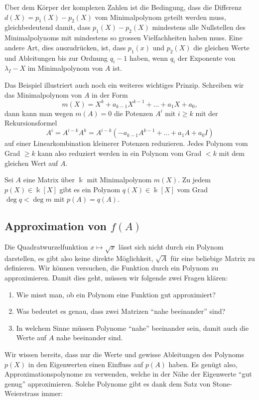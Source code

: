 Über dem Körper der komplexen Zahlen ist die Bedingung, dass die Differenz
$d(X)=p_1(X)-p_2(X)$ vom Minimalpolynom geteilt werden muss, gleichbedeutend
damit, dass $p_1(X)-p_2(X)$ mindestens alle Nullstellen des Minimalpolynoms
mit mindestens so grossen Vielfachheiten haben muss.
Eine andere Art, dies auszudrücken, ist, dass $p_1(x)$ und $p_2(X)$
die gleichen Werte und Ableitungen bis zur Ordnung $q_i-1$ haben, wenn
$q_i$ der Exponente von $\lambda_I-X$ im Minimalpolynom von $A$ ist.

Das Beispiel illustriert auch noch ein weiteres wichtiges Prinzip.
Schreiben wir das Minimalpolynom von $A$ in der Form
\[
m(X)
=
X^k + a_{k-1}X^{k-1} + \dots + a_1X + a_0,
\]
dann kann man wegen $m(A)=0$ die Potenzen $A^i$ mit $i\ge k$ mit der
Rekursionsformel
\[
A^i
=
A^{i-k}A^k
=
A^{i-k}(-a_{k-1}A^{k-1}+ \dots + a_1 A + a_0I)
\]
auf einer Linearkombination kleinerer Potenzen reduzieren.
Jedes Polynom vom Grad $\ge k$ kann also reduziert werden in
ein Polynom vom Grad $<k$ mit dem gleichen Wert auf $A$.

\begin{satz}
\label{buch:eigenwerte:satz:reduktion}
Sei $A$ eine Matrix über $\Bbbk$ mit Minimalpolynom $m(X)$.
Zu jedem $p(X)\in\Bbbk[X]$ gibt es ein Polynom $q(X)\in\Bbbk[X]$
vom Grad $\deg q<\deg m$ mit $p(A)=q(A)$.
\end{satz}

%
%
\subsection{Approximation von $f(A)$
\label{buch:subsection:approximation}}
Die Quadratwurzelfunktion $x\mapsto\sqrt{x}$ lässt sich nicht durch ein
%
Polynom darstellen, es gibt also keine direkte Möglichkeit, $\sqrt{A}$
für eine beliebige Matrix zu definieren.
Wir können versuchen, die Funktion durch ein Polynom zu approximieren.
Damit dies geht, müssen wir folgende zwei Fragen klären:
\begin{enumerate}
\item
Wie misst man, ob ein Polynom eine Funktion gut approximiert?
\item
Was bedeutet es genau, dass zwei Matrizen ``nahe beeinander'' sind?
\item
In welchem Sinne müssen Polynome ``nahe'' beeinander sein, damit
auch die Werte auf $A$ nahe beeinander sind.
\end{enumerate}

Wir wissen bereits, dass nur die Werte und gewisse Ableitungen des
Polynoms $p(X)$ in den Eigenwerten einen Einfluss auf $p(A)$ haben.
Es genügt also, Approximationspolynome zu verwenden, welche in der Nähe
der Eigenwerte ``gut genug'' approximieren.
Solche Polynome gibt es dank dem Satz von Stone-Weierstrass immer:

